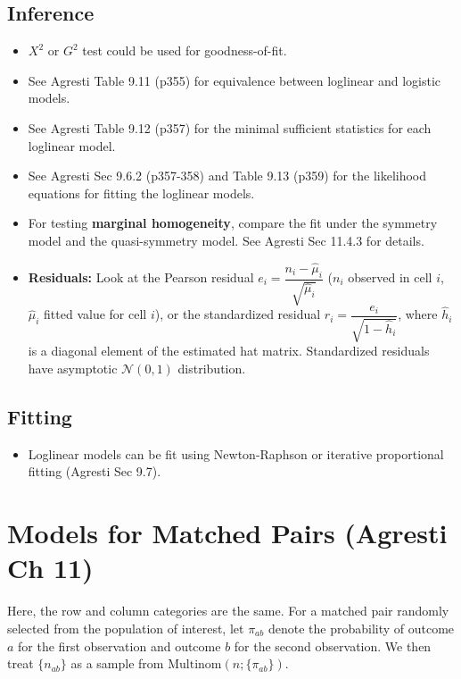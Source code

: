 \documentclass[twoside]{article}
\newcommand\calN{\mathcal{N}}
\begin{document}
\subsection*{Inference}
\begin{itemize}
\item $X^2$ or $G^2$ test could be used for goodness-of-fit.

\item See Agresti Table 9.11 (p355) for equivalence between loglinear and logistic models.

\item See Agresti Table 9.12 (p357) for the minimal sufficient statistics for each loglinear model.

\item See Agresti Sec 9.6.2 (p357-358) and Table 9.13 (p359) for the likelihood equations for fitting the loglinear models.

\item For testing \textbf{marginal homogeneity}, compare the fit under the symmetry model and the quasi-symmetry model. See Agresti Sec 11.4.3 for details.

\item \textbf{Residuals:} Look at the Pearson residual $e_i = \dfrac{n_i - \hat{\mu}_i}{\sqrt{\hat{\mu}_i}}$ ($n_i$ observed in cell $i$, $\hat{\mu}_i$ fitted value for cell $i$), or the standardized residual $r_i = \dfrac{e_i}{\sqrt{1 - \hat{h}_i}}$, where $\hat{h}_i$ is a diagonal element of the estimated hat matrix. Standardized residuals have asymptotic $\calN(0,1)$ distribution.
\end{itemize}

\subsection*{Fitting}
\begin{itemize}
\item Loglinear models can be fit using Newton-Raphson or iterative proportional fitting (Agresti Sec 9.7).
\end{itemize}

\section{Models for Matched Pairs (Agresti Ch 11)}
Here, the row and column categories are the same. For a matched pair randomly selected from the population of interest, let $\pi_{ab}$ denote the probability of outcome $a$ for the first observation and outcome $b$ for the second observation. We then treat $\{n_{ab}\}$ as a sample from $\text{Multinom}(n; \{ \pi_{ab}\})$.
\end{document}

